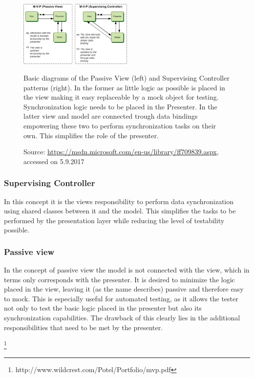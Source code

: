 \begin{figure}[htbp]
	\centering
	\label{fig:passive-view-supervision-controller}
	\includegraphics[width=0.5\textwidth]{./content/pictures/passive-view.png}
	\caption{Basic diagrams of the Passive View (left) and Supervising Controller patterns (right). In the former as little logic as possible is placed in the view making it easy replaceable by a mock object for testing. Synchronization logic needs to be placed in the Presenter. In the latter view and model are connected trough data bindings empowering these two to perform synchronization tasks on their own. This simplifies the role of the presenter.}
	\caption*{Source: \href{https://msdn.microsoft.com/en-us/library/ff709839.aspx}{https://msdn.microsoft.com/en-us/library/ff709839.aspx}, accessed on 5.9.2017}
\end{figure}

\subsubsection{Supervising Controller}
In this concept it is the views responsibility to perform data synchronization using shared classes between it and the model. This simplifies the tasks to be performed by the presentation layer while reducing the level of testability possible. 
\subsubsection{Passive view}
In the concept of passive view the model is not connected with the view, which in terms only corresponds with the presenter. It is desired to minimize the logic placed in the view, leaving it (as the name describes) passive and therefore easy to mock. This is especially useful for automated testing, as it allows the tester not only to test the basic logic placed in the presenter but also its synchronization capabilities. The drawback of this clearly lies in the additional responsibilities that need to be met by the presenter.

\footnote{http://www.wildcrest.com/Potel/Portfolio/mvp.pdf}


